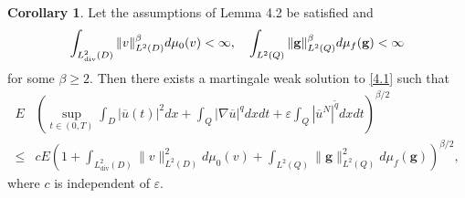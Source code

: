 \documentclass[reqno]{amsart}
\theoremstyle{definition}
\newtheorem{Corollary}{Corollary}[section]
\theoremstyle{remark}
\numberwithin{equation}{section} \allowdisplaybreaks
\begin{document}
\begin{Corollary}
Let the assumptions of Lemma 4.2 be satisfied and
$$\int_{L^2_{\rm{div}}(D)}\|v\|^\beta_{L^2(D)}d\mu_0(v)<\infty,\quad \int_{L^2(Q)}\|\mathbf{g}\|^\beta_{L^2(Q)}d\mu_f(\mathbf{g})<\infty$$
for some $\beta\geq2$. Then there exists a martingale weak solution to \eqref{4.1} such that
\begin{equation*}
\begin{split}
E&\left(\sup_{t\in(0,T)}\int_{D}|\overline{u}(t)|^2dx+\int_Q|\nabla \overline{u}|^qdxdt+\varepsilon\int_Q|\overline{u}^N|^{\tilde{q}}dxdt\right)^{\beta/2}\\
\leq
&cE\left(1+\int_{L^2_{\text{div}}(D)}\|v\|^2_{L^2(D)}d\mu_0(v)+\int_{L^2(Q)}\|\mathbf{g}\|^2_{L^2(Q)}d\mu_f(\mathbf{g})\right)^{\beta/2},
\end{split}
\end{equation*}
where $c$ is independent of $\varepsilon$.
\end{Corollary}
\end{document}
